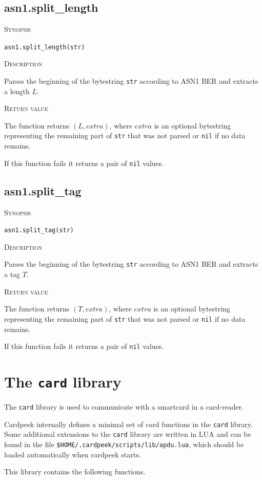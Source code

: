 \documentclass[11pt]{report}
\newcommand{\mansection}[1]{\vspace{0.5em}\par\noindent\textsc{#1}\vspace{0.5em}\par}
\begin{document}
\subsection{asn1.split\_length}

\mansection{Synopsis}
\texttt{asn1.split\_length(str)}

\mansection{Description}
  Parses the beginning of the bytestring \texttt{str} according to ASN1 BER 
  and extracts a length $L$. 

\mansection{Return value}
  The function returns $(L, extra)$, where $extra$ is an optional bytestring 
  representing the remaining part of \texttt{str} that was not parsed or \texttt{nil} 
  if no data remains.

  If this function fails it returns a pair of \texttt{nil} values.


\subsection{asn1.split\_tag}

\mansection{Synopsis}
\texttt{asn1.split\_tag(str)}

\mansection{Description}
  Parses the beginning of the bytestring \texttt{str} according to ASN1 BER 
  and extracts a tag $T$. 

\mansection{Return value}
  The function returns $(T, extra)$, where $extra$ is an optional bytestring 
  representing the remaining part of \texttt{str} that was not parsed or 
  \texttt{nil} if no data remains.

  If this function fails it returns a pair of \texttt{nil} values.


\section{The \texttt{card} library}

The \texttt{card} library is used to communicate with a smartcard in a card-reader.

Cardpeek internally defines a minimal set of card functions in the \texttt{card} 
library.
Some additional extensions to the \texttt{card} library are written in LUA and can
be found in the file \texttt{\$HOME/.cardpeek/scripts/lib/apdu.lua}, which should 
be loaded automatically when cardpeek starts.

This library contains the following functions.
\end{document}
